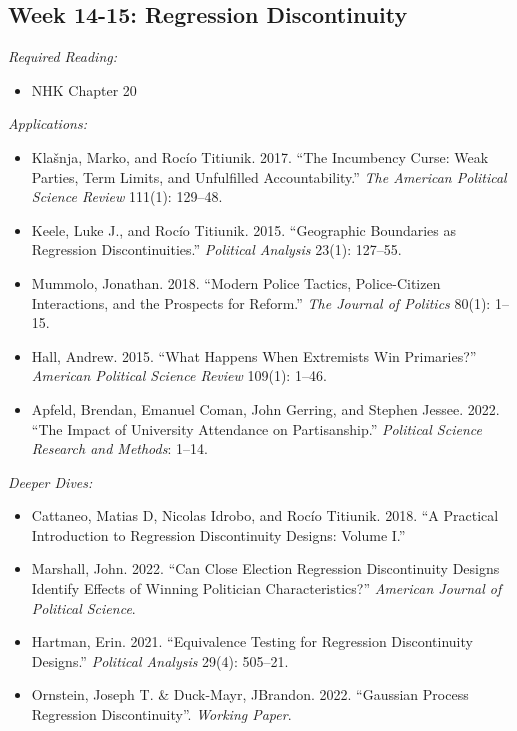\documentclass[11pt, letterpaper]{article}
\begin{document}
\subsection*{Week 14-15: Regression Discontinuity}

\textit{Required Reading:}

\begin{itemize}
	\item NHK Chapter 20
\end{itemize}


\noindent \textit{Applications:}

\begin{itemize}
	\item Klašnja, Marko, and Rocío Titiunik. 2017. ``The Incumbency Curse: Weak Parties, Term Limits, and Unfulfilled Accountability.'' \textit{The American Political Science Review} 111(1): 129–48.
	\item Keele, Luke J., and Rocío Titiunik. 2015. ``Geographic Boundaries as Regression Discontinuities.'' \textit{Political Analysis} 23(1): 127–55.
	\item Mummolo, Jonathan. 2018. ``Modern Police Tactics, Police-Citizen Interactions, and the Prospects for Reform.'' \textit{The Journal of Politics} 80(1): 1–15.
	\item Hall, Andrew. 2015. ``What Happens When Extremists Win Primaries?'' \textit{American Political Science Review} 109(1): 1–46.
	\item Apfeld, Brendan, Emanuel Coman, John Gerring, and Stephen Jessee. 2022. ``The Impact of University Attendance on Partisanship.'' \textit{Political Science Research and Methods}: 1–14.
\end{itemize}

\noindent \textit{Deeper Dives:}

\begin{itemize}
	
	\item Cattaneo, Matias D, Nicolas Idrobo, and Rocío Titiunik. 2018. ``A Practical Introduction to Regression Discontinuity Designs: Volume I.''
	\item Marshall, John. 2022. ``Can Close Election Regression Discontinuity Designs Identify Effects of Winning Politician Characteristics?'' \textit{American Journal of Political Science}.
	\item Hartman, Erin. 2021. ``Equivalence Testing for Regression Discontinuity Designs.'' \textit{Political Analysis} 29(4): 505–21.
	\item Ornstein, Joseph T. \& Duck-Mayr, JBrandon. 2022. ``Gaussian Process Regression Discontinuity''. \textit{Working Paper}.
\end{itemize}
\end{document}
